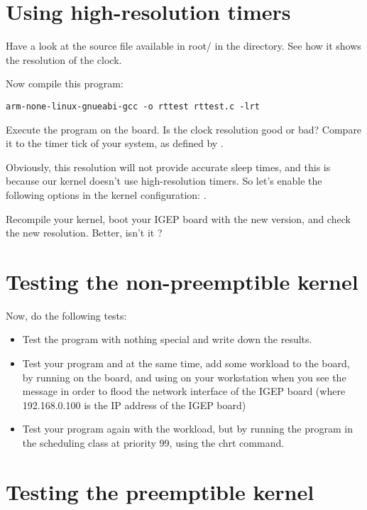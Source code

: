 \section{Using high-resolution timers}

Have a look at the  source file available in root/ in
the  directory. See how it shows the resolution of the
 clock.

Now compile this program:
\begin{verbatim}
arm-none-linux-gnueabi-gcc -o rttest rttest.c -lrt
\end{verbatim}

Execute the program on the board. Is the clock resolution good or bad?
Compare it to the timer tick of your system, as defined by .

Obviously, this resolution will not provide accurate sleep times, and
this is because our kernel doesn't use high-resolution timers. So
let's enable the following options in the kernel configuration:
.

Recompile your kernel, boot your IGEP board with the new version, and
check the new resolution. Better, isn't it ?

\section{Testing the non-preemptible kernel}

Now, do the following tests:
\begin{itemize}
\item Test the program with nothing special and write down the
  results.
\item Test your program and at the same time, add some workload to the
  board, by running  on the board,
  and using  on your workstation when
  you see the message  in order to
  flood the network interface of the IGEP board (where 192.168.0.100
  is the IP address of the IGEP board)
\item Test your program again with the workload, but by running the
  program in the  scheduling class at priority 99,
  using the chrt command.
\end{itemize}

\section{Testing the preemptible kernel}

